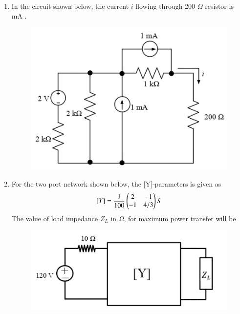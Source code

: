 \documentclass[a4paper, 11pt]{article}
\begin{document}
\begin{enumerate}
    \hfill{}
    
    \item In the circuit shown below, the current $i$ flowing through 200 $\Omega$ resistor is \underline{\hspace{2cm}} mA .
    \begin{figure}[H]
        \centering
        \includegraphics[width=0.5\columnwidth]{figs/Q22.png}
        \caption*{}
        \label{fig:q32}
    \end{figure}
    
    \hfill{}
    
    \item For the two port network shown below, the [Y]-parameters is given as
    \[ [Y] = \frac{1}{100} \begin{pmatrix}2 & -1 \\ -1 & 4/3\end{pmatrix} S \]
    The value of load impedance $Z_L$ in $\Omega$, for maximum power transfer will be \underline{\hspace{2cm}} \\
    \begin{figure}[H]
        \centering
        \includegraphics[width=0.5\columnwidth]{figs/Q23.png}
        \caption*{}
        \label{fig:q33}
    \end{figure}
    
    \hfill{}
    

\end{enumerate}
\end{document}
